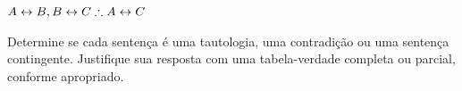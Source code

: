 \begin{compactlist}
\item $A\eiff B, B\eiff C \therefore A\eiff C$ %
\end{compactlist}

\problempart
\label{pr.TT.TTorC3}
Determine se cada sentença é uma tautologia, uma contradição ou uma sentença contingente. Justifique sua resposta com uma tabela-verdade completa ou parcial, conforme apropriado.


